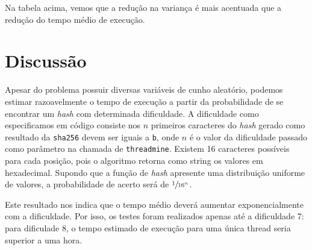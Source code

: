 \documentclass[12pt]{article}
\begin{document}
Na tabela acima, vemos que a redução na variança é mais acentuada que a redução do tempo médio de execução.

\section{Discussão}
Apesar do problema possuir diversas variáveis de cunho aleatório, podemos estimar razoavelmente o tempo de execução a partir da probabilidade de se encontrar um \textit{hash} com determinada dificuldade. A dificuldade como especificamos em código consiste nos $n$ primeiros caracteres do \textit{hash} gerado como resultado da \texttt{sha256} devem ser iguais a \texttt{\textquotesingle{}b\textquotesingle{}}, onde $n$ é o valor da dificuldade passado como parâmetro na chamada de \texttt{threadmine}. Existem 16 caracteres possíveis para cada posição, pois o algoritmo retorna como string os valores em hexadecimal. Supondo que a função de \textit{hash} apresente uma distribuição uniforme de valores, a probabilidade de acerto será de $\sfrac{1}{16^{n}}$.

Este resultado nos indica que o tempo médio deverá aumentar exponencialmente com a dificuldade. Por isso, os testes foram realizados apenas até a dificuldade 7: para dificulade 8, o tempo estimado de execução para uma única thread seria superior a uma hora.

\nocite{*}
\printbibliography
\end{document}
